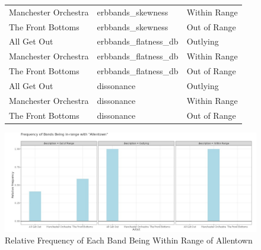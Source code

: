 \documentclass{article}\usepackage[]{graphicx}\usepackage[]{xcolor}
\begin{document}
\begin{figure}
\begin{table}[H]
\begin{tabular}{lll}
  Manchester Orchestra & erbbands\_skewness & Within Range \\ 
  The Front Bottoms & erbbands\_skewness & Out of Range \\ 
  All Get Out & erbbands\_flatness\_db & Outlying \\ 
  Manchester Orchestra & erbbands\_flatness\_db & Within Range \\ 
  The Front Bottoms & erbbands\_flatness\_db & Out of Range \\ 
  All Get Out & dissonance & Outlying \\ 
  Manchester Orchestra & dissonance & Within Range \\ 
  The Front Bottoms & dissonance & Out of Range \\ 
   \hline
\end{tabular}
\endgroup
\label{song.tab}
\end{table}

\end{figure}
\begin{figure}[H]
\begin{center}
\includegraphics[scale=0.5]{datfigure.jpg}
\caption{Relative Frequency of Each Band Being Within Range of Allentown}
\label{plot1}
\end{center}
\end{figure}
\end{document}
